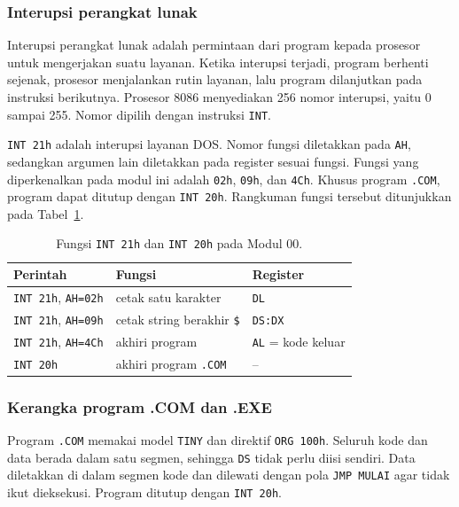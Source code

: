 \subsubsection*{Interupsi perangkat lunak}

Interupsi perangkat lunak adalah permintaan dari program kepada
prosesor untuk mengerjakan suatu layanan. Ketika interupsi terjadi,
program berhenti sejenak, prosesor menjalankan rutin layanan, lalu
program dilanjutkan pada instruksi berikutnya. Prosesor 8086
menyediakan 256 nomor interupsi, yaitu 0 sampai 255. Nomor dipilih
dengan instruksi \texttt{INT}.

\texttt{INT 21h} adalah interupsi layanan DOS. Nomor fungsi
diletakkan pada \texttt{AH}, sedangkan argumen lain diletakkan pada
register sesuai fungsi. Fungsi yang diperkenalkan pada modul ini
adalah \texttt{02h}, \texttt{09h}, dan \texttt{4Ch}. Khusus program
\texttt{.COM}, program dapat ditutup dengan \texttt{INT 20h}.
Rangkuman fungsi tersebut ditunjukkan pada Tabel~\ref{tab:m00-int21}.

\begin{table}[H]
    \centering
    \caption{Fungsi \texttt{INT 21h} dan \texttt{INT 20h} pada Modul 00.}
    \label{tab:m00-int21}
    \small
    \begin{tabular}{@{}lll@{}}
        \toprule
        \textbf{Perintah} & \textbf{Fungsi} & \textbf{Register} \\
        \midrule
        \texttt{INT 21h}, \texttt{AH=02h} & cetak satu karakter
        & \texttt{DL} \\
        \texttt{INT 21h}, \texttt{AH=09h} & cetak string berakhir
        \texttt{\$} & \texttt{DS:DX} \\
        \texttt{INT 21h}, \texttt{AH=4Ch} & akhiri program
        & \texttt{AL} = kode keluar \\
        \texttt{INT 20h} & akhiri program \texttt{.COM} & -- \\
        \bottomrule
    \end{tabular}
\end{table}

\subsubsection*{Kerangka program .COM dan .EXE}

Program \texttt{.COM} memakai model \texttt{TINY} dan direktif
\texttt{ORG 100h}. Seluruh kode dan data berada dalam satu segmen,
sehingga \texttt{DS} tidak perlu diisi sendiri. Data diletakkan di
dalam segmen kode dan dilewati dengan pola \texttt{JMP MULAI} agar
tidak ikut dieksekusi. Program ditutup dengan \texttt{INT 20h}.

